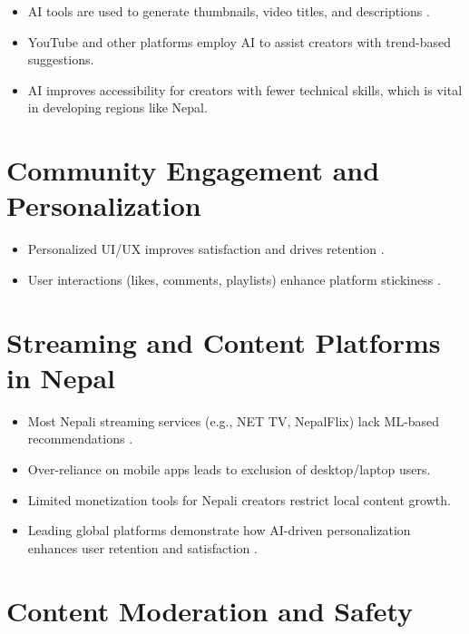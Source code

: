 \begin{itemize}[leftmargin=2cm]
  \item AI tools are used to generate thumbnails, video titles, and descriptions \cite{dugan2025genai}.
  \item YouTube and other platforms employ AI to assist creators with trend-based suggestions.
  \item AI improves accessibility for creators with fewer technical skills, which is vital in developing regions like Nepal.
\end{itemize}

\section{Community Engagement and Personalization}

\begin{itemize}[leftmargin=2cm]
  \item Personalized UI/UX improves satisfaction and drives retention \cite{vercel2024nextjs}.
  \item User interactions (likes, comments, playlists) enhance platform stickiness \cite{joshi2025sentiment, kharel2024social}.
\end{itemize}

\section{Streaming and Content Platforms in Nepal}

\begin{itemize}[leftmargin=2cm]
  \item Most Nepali streaming services (e.g., NET TV, NepalFlix) lack ML-based recommendations \cite{covington2016deep, mageai2022youtube}.
  \item Over-reliance on mobile apps leads to exclusion of desktop/laptop users.
  \item Limited monetization tools for Nepali creators restrict local content growth.
  \item Leading global platforms demonstrate how AI-driven personalization enhances user retention and satisfaction \cite{elinext2025ai, gomezuribe2016netflix}.
\end{itemize}

\section{Content Moderation and Safety}

